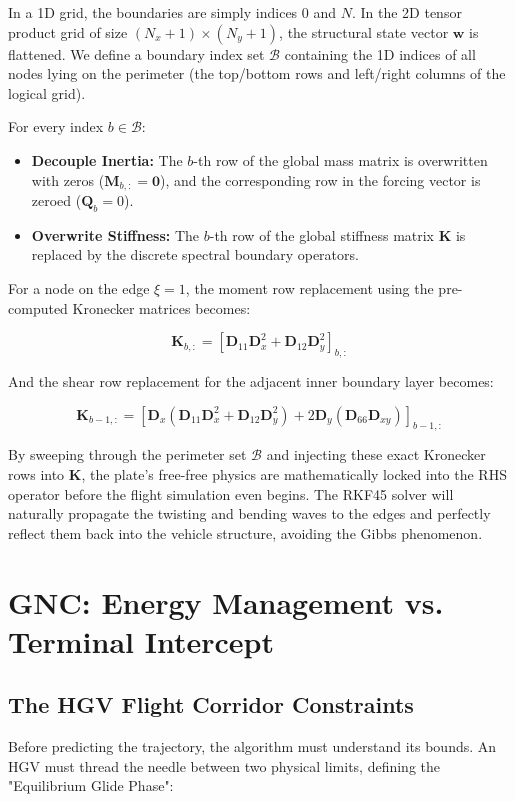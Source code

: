 \documentclass[11pt,a4paper]{article}
\theoremstyle{definition}
\numberwithin{equation}{section}
\begin{document}
In a 1D grid, the boundaries are simply indices $0$ and $N$. In the 2D tensor product grid of size $(N_x+1) \times (N_y+1)$, the structural state vector $\mathbf{w}$ is flattened. We define a boundary index set $\mathcal{B}$ containing the 1D indices of all nodes lying on the perimeter (the top/bottom rows and left/right columns of the logical grid).

For every index $b \in \mathcal{B}$:
\begin{itemize}
    \item \textbf{Decouple Inertia:} The $b$-th row of the global mass matrix is overwritten with zeros ($\mathbf{M}_{b, :} = \mathbf{0}$), and the corresponding row in the forcing vector is zeroed ($\mathbf{Q}_b = 0$).
    \item \textbf{Overwrite Stiffness:} The $b$-th row of the global stiffness matrix $\mathbf{K}$ is replaced by the discrete spectral boundary operators.
\end{itemize}

For a node on the edge $\xi = 1$, the moment row replacement using the pre-computed Kronecker matrices becomes:

$$\mathbf{K}_{b, :} = \left[ \mathbf{D}_{11} \mathbf{D}_x^2 + \mathbf{D}_{12} \mathbf{D}_y^2 \right]_{b, :}$$

And the shear row replacement for the adjacent inner boundary layer becomes:

$$\mathbf{K}_{b-1, :} = \left[ \mathbf{D}_x \left( \mathbf{D}_{11} \mathbf{D}_x^2 + \mathbf{D}_{12} \mathbf{D}_y^2 \right) + 2 \mathbf{D}_y \left( \mathbf{D}_{66} \mathbf{D}_{xy} \right) \right]_{b-1, :}$$

By sweeping through the perimeter set $\mathcal{B}$ and injecting these exact Kronecker rows into $\mathbf{K}$, the plate's free-free physics are mathematically locked into the RHS operator before the flight simulation even begins. The RKF45 solver will naturally propagate the twisting and bending waves to the edges and perfectly reflect them back into the vehicle structure, avoiding the Gibbs phenomenon.

\section{GNC: Energy Management vs. Terminal Intercept}
\label{sec:gnc}

\subsection{The HGV Flight Corridor Constraints}
Before predicting the trajectory, the algorithm must understand its bounds. An HGV must thread the needle between two physical limits, defining the "Equilibrium Glide Phase":
\end{document}

